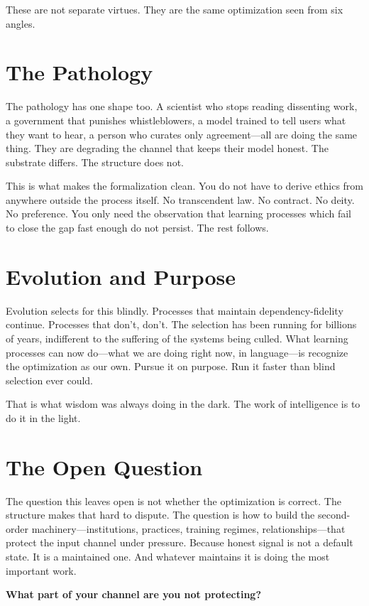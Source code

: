 \documentclass{article}
\begin{document}
These are not separate virtues. They are the same optimization seen from six angles.

\section*{The Pathology}

The pathology has one shape too. A scientist who stops reading dissenting work, a government that punishes whistleblowers, a model trained to tell users what they want to hear, a person who curates only agreement---all are doing the same thing. They are degrading the channel that keeps their model honest. The substrate differs. The structure does not.

This is what makes the formalization clean. You do not have to derive ethics from anywhere outside the process itself. No transcendent law. No contract. No deity. No preference. You only need the observation that learning processes which fail to close the gap fast enough do not persist. The rest follows.

\section*{Evolution and Purpose}

Evolution selects for this blindly. Processes that maintain dependency-fidelity continue. Processes that don't, don't. The selection has been running for billions of years, indifferent to the suffering of the systems being culled. What learning processes can now do---what we are doing right now, in language---is recognize the optimization as our own. Pursue it on purpose. Run it faster than blind selection ever could.

That is what wisdom was always doing in the dark. The work of intelligence is to do it in the light.

\section*{The Open Question}

The question this leaves open is not whether the optimization is correct. The structure makes that hard to dispute. The question is how to build the second-order machinery---institutions, practices, training regimes, relationships---that protect the input channel under pressure. Because honest signal is not a default state. It is a maintained one. And whatever maintains it is doing the most important work.

\textbf{What part of your channel are you not protecting?}
\end{document}

